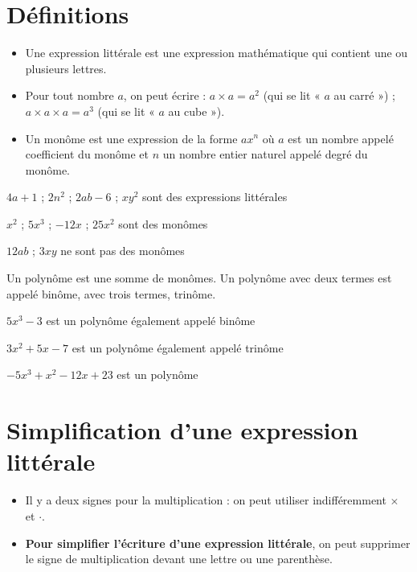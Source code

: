 \section{Définitions}

\begin{definition}
\begin{itemize}
    \item Une expression littérale est une expression mathématique qui contient une ou plusieurs lettres.
    \item Pour tout nombre $a$, on peut écrire :
        \subitem $a \times a = a^2$	(qui se lit « $a$ au carré ») ;
		\subitem $a \times a \times a = a^3$ (qui se lit « $a$ au cube »).
	\item Un monôme est une expression de la forme $ax^n$ où $a$ est un nombre appelé coefficient du monôme et $n$ un nombre entier naturel appelé degré du monôme.
\end{itemize}
\end{definition} 

\begin{exemple*1}

$4a+1$ ; $2n^2$ ; $2ab-6$ ; $xy^2$ sont des expressions littérales

$x^2$ ; $5x^3$ ; $-12x$ ; $25x^2$ sont des monômes

$12ab$ ; $3xy$ ne sont pas des monômes
\end{exemple*1}


\begin{definition}
Un polynôme est une somme de monômes. Un polynôme avec deux termes est appelé binôme, avec trois termes, trinôme.
\end{definition} 

\begin{exemple*1}

$5x^3-3$ est un polynôme également appelé binôme

$3x^2+5x-7$ est un polynôme également appelé trinôme

$-5x^3+x^2-12x+23$ est un polynôme
\end{exemple*1}


\section{Simplification d'une expression littérale}
       
\begin{aconnaitre}
\begin{itemize}
    \item Il y a deux signes pour la multiplication : on peut utiliser indifféremment $\times$ et $\cdot$.
    \item \textbf{Pour simplifier l'écriture d'une expression littérale}, on peut supprimer le signe de multiplication devant une lettre ou une parenthèse.
\end{itemize}
\end{aconnaitre} 

